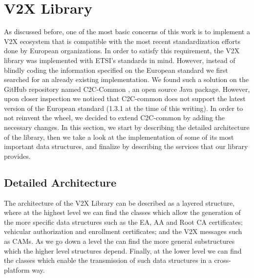 \section{V2X Library}
As discussed before, one of the most basic concerns of this work is to implement a V2X ecosystem that is compatible with the most recent standardization efforts done by European organizations. In order to satisfy this requirement, the V2X library was implemented with ETSI’s standards in mind.
However, instead of blindly coding the information specified on the European standard we first searched for an already existing implementation. We found such a solution on the GitHub repository named C2C-Common \cite{c2c-common}, an open source Java package. However, upon closer inspection we noticed that C2C-common does not support the latest version of the European standard (1.3.1 at the time of this writing). In order to not reinvent the wheel, we decided to extend C2C-common by adding the necessary changes. In this section, we start by describing the detailed architecture of the library, then we take a look at the implementation of some of its most important data structures, and finalize by describing the services that our library provides. 

\subsection{Detailed Architecture}
The architecture of the V2X Library can be described as a layered structure, where at the highest level we can find the classes which allow the generation of the more specific data structures such as the EA, AA and Root CA certificates; vehicular authorization and enrollment certificates; and the V2X messages such as CAMs. As we go down a level the can find the more general substructures which the higher level structures depend. Finally, at the lower level we can find the classes which enable the transmission of such data structures in a cross-platform way.

